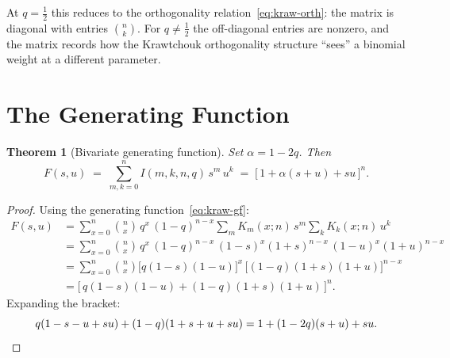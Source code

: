 \documentclass[11pt,a4paper]{article}
\theoremstyle{plain}
\newtheorem{theorem}{Theorem}[section]
\theoremstyle{definition}
\begin{document}
At $q = \tfrac12$ this reduces to the orthogonality
relation~\eqref{eq:kraw-orth}: the matrix is diagonal with entries
$\binom{n}{k}$. For $q \ne \tfrac12$ the off-diagonal entries are
nonzero, and the matrix records how the Krawtchouk orthogonality
structure ``sees'' a binomial weight at a different parameter.

\section{The Generating Function}

\begin{tcolorbox}[colback=black!5, colframe=black!5, boxrule=0pt,
  sharp corners]
\begin{theorem}[Bivariate generating function]\label{thm:gf}
Set $\alpha = 1 - 2q$. Then
\begin{equation}\label{eq:gf}
  F(s, u) \;=\; \sum_{m,k=0}^{n} I(m, k, n, q)\, s^m\, u^k
  \;=\; \bigl[\,1 + \alpha(s + u) + su\,\bigr]^n.
\end{equation}
\end{theorem}
\end{tcolorbox}

\begin{proof}
Using the generating function~\eqref{eq:kraw-gf}:
\begin{align*}
  F(s,u)
  &= \sum_{x=0}^{n} \binom{n}{x}\, q^x\, (1-q)^{n-x}
     \sum_m K_m(x;n)\, s^m \sum_k K_k(x;n)\, u^k \\
  &= \sum_{x=0}^{n} \binom{n}{x}\, q^x\, (1-q)^{n-x}\,
     (1-s)^x(1+s)^{n-x}\, (1-u)^x(1+u)^{n-x} \\
  &= \sum_{x=0}^{n} \binom{n}{x}
     \bigl[q(1-s)(1-u)\bigr]^x\,
     \bigl[(1-q)(1+s)(1+u)\bigr]^{n-x} \\
  &= \bigl[\, q(1-s)(1-u) + (1-q)(1+s)(1+u) \,\bigr]^n.
\end{align*}
Expanding the bracket:
\[
  q(1 - s - u + su) + (1-q)(1 + s + u + su)
  = 1 + (1-2q)(s+u) + su.
  \qedhere
\]
\end{proof}
\end{document}
